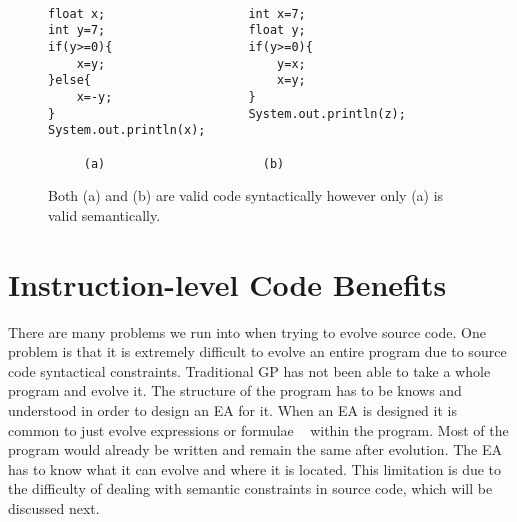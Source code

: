 \documentclass{sig-alternate}
\begin{document}
\begin{figure}
\centering
{\tt
\begin{verbatim}
float x;                    int x=7;
int y=7;                    float y;
if(y>=0){                   if(y>=0){
    x=y;                        y=x;
}else{                          x=y;
    x=-y;                   }
}                           System.out.println(z);
System.out.println(x);	
     
     (a)                      (b)

\end{verbatim}
}
\caption{Both (a) and (b) are valid code syntactically however only (a) is valid semantically.}
\label{semantics}
\end{figure}



\section{Instruction-level Code Benefits}

There are many problems we run into when trying to evolve source code. One problem is that it is extremely difficult to evolve an entire program due to source code syntactical constraints. Traditional GP has not been able to take a whole program and evolve it. The structure of the program has to be knows and understood in order to design an EA for it. When an EA is designed it is common to just evolve expressions or formulae ~\cite{FINCH:2011} within the program. Most of the program would already be written and remain the same after evolution. The EA has to know what it can evolve and where it is located. This limitation is due to the difficulty of dealing with semantic constraints in source code, which will be discussed next.
\end{document}
